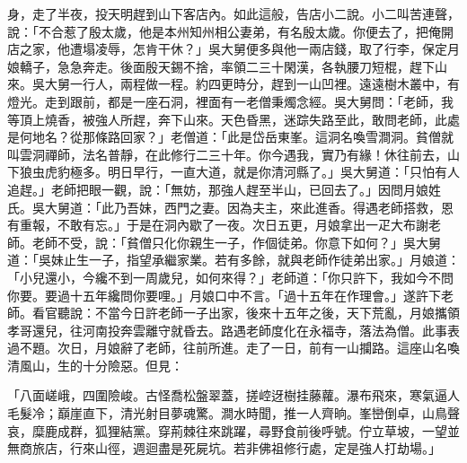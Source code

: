 \begin{showcontents}{}
身，走了半夜，投天明趕到山下客店內。如此這般，告店小二說。小二叫苦連聲，說：「不合惹了殷太歲，他是本州知州相公妻弟，有名殷太歲。你便去了，把俺開店之家，他遭塌凌辱，怎肯干休？」吳大舅便多與他一兩店錢，取了行李，保定月娘轎子，急急奔走。後面殷天錫不捨，率領二三十閑漢，各執腰刀短棍，趕下山來。吳大舅一行人，兩程做一程。約四更時分，趕到一山凹裡。遠遠樹木叢中，有燈光。走到跟前，都是一座石洞，裡面有一老僧秉燭念經。吳大舅問：「老師，我等頂上燒香，被強人所趕，奔下山來。天色昏黑，迷踪失路至此，敢問老師，此處是何地名？從那條路回家？」老僧道：「此是岱岳東峯。這洞名喚雪澗洞。貧僧就叫雲洞禪師，法名普靜，在此修行二三十年。你今遇我，實乃有緣！休往前去，山下狼虫虎豹極多。明日早行，一直大道，就是你清河縣了。」吳大舅道：「只怕有人追趕。」老師把眼一觀，說：「無妨，那強人趕至半山，已回去了。」因問月娘姓氏。吳大舅道：「此乃吾妹，西門之妻。因為夫主，來此進香。得遇老師搭救，恩有重報，不敢有忘。」于是在洞內歇了一夜。次日五更，月娘拿出一疋大布謝老師。老師不受，說：「貧僧只化你親生一子，作個徒弟。你意下如何？」吳大舅道：「吳妹止生一子，指望承繼家業。若有多餘，就與老師作徒弟出家。」月娘道：「小兒還小，今纔不到一周歲兒，如何來得？」老師道：「你只許下，我如今不問你要。要過十五年纔問你要哩。」月娘口中不言。「過十五年在作理會。」遂許下老師。看官聽說：不當今日許老師一子出家，後來十五年之後，天下荒亂，月娘攜領孝哥還兒，往河南投奔雲離守就昏去。路遇老師度化在永福寺，落法為僧。此事表過不題。次日，月娘辭了老師，往前所進。走了一日，前有一山攔路。這座山名喚清風山，生的十分險惡。但見：

「八面嵯峨，四圍險峻。古怪喬松盤翠蓋，搓崆迓樹挂藤蘿。瀑布飛來，寒氣逼人毛髮冷；巔崖直下，清光射目夢魂驚。澗水時聞，推一人齊晌。峯巒倒卓，山鳥聲哀，糜鹿成群，狐狸結黨。穿荊棘往來跳躍，尋野食前後呼號。佇立草坡，一望並無商旅店，行來山徑，週迴盡是死屍坑。若非佛祖修行處，定是強人打劫場。」


\end{showcontents}
